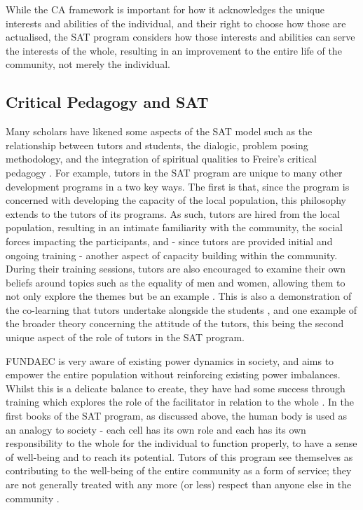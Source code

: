 While the CA framework is important for how it acknowledges the unique interests and abilities of the individual, and their right to choose how those are actualised, the SAT program considers how those interests and abilities can serve the interests of the whole, resulting in an improvement to the entire life of the community, not merely the individual.  


\newpage
\subsection{Critical Pedagogy and SAT}

Many scholars have likened some aspects of the SAT model such as the relationship between tutors and students, the dialogic, problem posing methodology, and the integration of spiritual qualities to Freire's critical pedagogy \citep[see for example][]{Murphy-Graham2010,Murphy-Graham2014,Roosta2002,Murphy-Graham2012,VanderDussen2009}. For example, tutors in the SAT program are unique to many other development programs in a two key ways. The first is that, since the program is concerned with developing the capacity of the local population, this philosophy extends to the tutors of its programs. As such, tutors are hired from the local population, resulting in an intimate familiarity with the community, the social forces impacting the participants, and - since tutors are provided initial and ongoing training - another aspect of capacity building within the community. During their training sessions, tutors are also encouraged to examine their own beliefs around topics such as the equality of men and women, allowing them to not only explore the themes but be an example \citep{Graham-Murphy2009}. This is also a demonstration of the co-learning that tutors undertake alongside the students \citep{Murphy-Graham2014}, and one example of the broader theory concerning the attitude of the tutors, this being the second unique aspect of the role of tutors in the SAT program.

FUNDAEC is very aware of existing power dynamics in society, and aims to empower the entire population without reinforcing existing power imbalances. Whilst this is a delicate balance to create, they have had some success through training which explores the role of the facilitator in relation to the whole \citep{Murphy-Graham2012}. In the first books of the SAT program, as discussed above, the human body is used as an analogy to society - each cell has its own role and each has its own responsibility to the whole for the individual to function properly, to have a sense of well-being and to reach its potential. Tutors of this program see themselves as contributing to the well-being of the entire community as a form of service; they are not generally treated with any more (or less) respect than anyone else in the community \citep{Honeyman2010}. 



